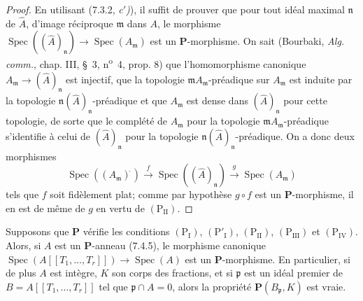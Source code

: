 \begin{proof}
En utilisant (7.3.2, \emph{c$'$)}), il suffit de prouver que pour tout idéal
maximal $\mathfrak n$ de $\widehat A$, d'image réciproque $\mathfrak m$
dans $A$, le morphisme
$\operatorname{Spec}((\widehat A)_{\mathfrak n})\to
\operatorname{Spec}(A_{\mathfrak m})$ est un $\boldsymbol P$-morphisme.
On sait (Bourbaki, \emph{Alg. comm.}, chap. III, \S~3,
n\textsuperscript{o}~4, prop. 8) que l'homomorphisme canonique
$A_{\mathfrak m}\to(\widehat A)_{\mathfrak n}$ est injectif, que la
topologie $\mathfrak mA_{\mathfrak m}$-préadique sur $A_{\mathfrak m}$ est
induite par la topologie
$\mathfrak n(\widehat A)_{\mathfrak n}$-préadique et que
$A_{\mathfrak m}$ est dense dans $(\widehat A)_{\mathfrak n}$ pour cette
topologie, de sorte que le complété de $A_{\mathfrak m}$ pour la topologie
$\mathfrak mA_{\mathfrak m}$-préadique s'identifie à celui de
$(\widehat A)_{\mathfrak n}$ pour la topologie
$\mathfrak n(\widehat A)_{\mathfrak n}$-préadique. On a donc deux morphismes
\[
\operatorname{Spec}((A_{\mathfrak m})^{\widehat{\,}})
\xrightarrow{f}\operatorname{Spec}((\widehat A)_{\mathfrak n})
\xrightarrow{g}\operatorname{Spec}(A_{\mathfrak m})
\]
tels que $f$ soit fidèlement plat; comme par hypothèse $g\circ f$ est un
$\boldsymbol P$-morphisme, il en est de même de $g$ en vertu de
$(\mathrm P_{\mathrm{II}})$.
\end{proof}

\begin{corollary}[7.4.7]
\label{IV.2.s7.4.7-fr}
Supposons que $\boldsymbol P$ vérifie les conditions
$(\mathrm P_{\mathrm I})$, $(\mathrm P'_{\mathrm I})$,
$(\mathrm P_{\mathrm{II}})$, $(\mathrm P_{\mathrm{III}})$ et
$(\mathrm P_{\mathrm{IV}})$. Alors, si $A$ est un
$\boldsymbol P$-anneau (7.4.5), le morphisme canonique
$\operatorname{Spec}(A[[T_1,\ldots,T_r]])\to\operatorname{Spec}(A)$ est un
$\boldsymbol P$-morphisme. En particulier, si de plus $A$ est intègre, $K$
son corps des fractions, et si $\mathfrak p$ est un idéal premier de
$B=A[[T_1,\ldots,T_r]]$ tel que $\mathfrak p\cap A=0$, alors la propriété
$\boldsymbol P(B_{\mathfrak p},K)$ est vraie.
\end{corollary}

